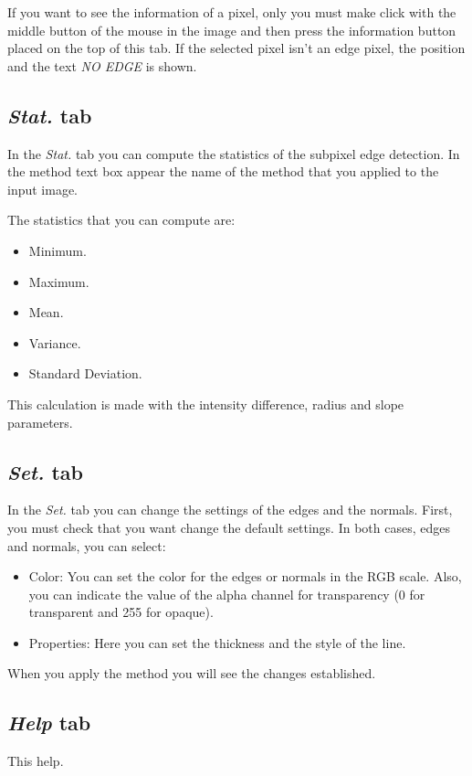 \documentclass{article}
\begin{document}
If you want to see the information of a pixel, only you must make click with the middle button of the mouse in the image and then press the information button placed on the top of this tab. If the selected pixel isn't an edge pixel, the position and the text \emph{NO EDGE} is shown.

\subsection{\emph{Stat.} tab}
In the \emph{Stat.} tab you can compute the statistics of the subpixel edge detection. In the method text box appear the name of the method that you applied to the input image.

The statistics that you can compute are:
\begin{itemize}
	\item Minimum.
	\item Maximum.
	\item Mean.
	\item Variance.
	\item Standard Deviation.
\end{itemize} 

This calculation is made with the intensity difference, radius and slope parameters.

\subsection{\emph{Set.} tab}
In the \emph{Set.} tab you can change the settings of the edges and the normals. First, you must check that you want change the default settings.
In both cases, edges and normals, you can select:
\begin{itemize}
	\item Color: You can set the color for the edges or normals in the RGB scale. Also, you can indicate the value of the alpha channel for transparency (0 for transparent and 255 for opaque).
	\item Properties: Here you can set the thickness and the style of the line.
\end{itemize}

When you apply the method you will see the changes established.

\subsection{\emph{Help} tab}
This help.
\end{document}
